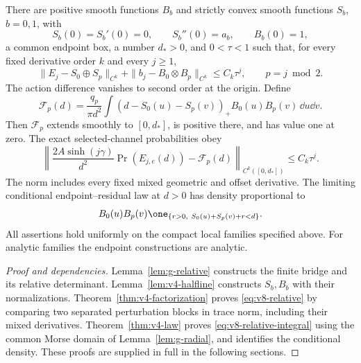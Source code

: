 \begin{theorem}\label{thm:v8-main-relative}
There are positive smooth functions $B_b$ and strictly convex smooth
functions $S_b$, $b=0,1$, with
\[
 S_b(0)=S_b'(0)=0,\qquad S_b''(0)=a_b,\qquad B_b(0)=1,
\]
a common endpoint box, a number $d_*>0$, and $0<\tau<1$ such that,
for every fixed derivative order $k$ and every $j\ge1$,
\begin{equation}\label{eq:v8-relative}
 \|E_j-S_0\oplus S_p\|_{C^k}
 +\|b_j-B_0\otimes B_p\|_{C^k}\le C_k\tau^j,
                    \qquad p=j\bmod2.
\end{equation}
The action difference vanishes to second order at the origin. Define
\begin{equation}\label{eq:v8-boundary-integral}
 \mathcal F_p(d)=\frac{q_p}{\pi d^2}
  \int(d-S_0(u)-S_p(v))_+B_0(u)B_p(v)\,\dd u\dd v.
\end{equation}
Then $\mathcal F_p$ extends smoothly to $[0,d_*]$, is positive there,
and has value one at zero. The exact selected-channel probabilities obey
\begin{equation}\label{eq:v8-relative-integral}
 \left\|\frac{2A\sinh(j\gamma)}{d^2}
           \Pr(E_{j,e}(d))-\mathcal F_p(d)\right\|_{C^k([0,d_*])}
                                  \le C_k\tau^j.
\end{equation}
The norm includes every fixed mixed geometric and offset derivative.
The limiting conditional endpoint--residual law at $d>0$ has density
proportional to
\[
 B_0(u)B_p(v)\one_{\{r>0,\ S_0(u)+S_p(v)+r<d\}}.
\]
All assertions hold uniformly on the compact local families specified
above. For analytic families the endpoint constructions are analytic.
\end{theorem}

\begin{proof}[Proof and dependencies]
Lemma~\ref{lem:g-relative} constructs the finite bridge and its relative
determinant. Lemma~\ref{lem:v4-halfline} constructs $S_b,B_b$ with their
normalizations. Theorem~\ref{thm:v4-factorization} proves
\eqref{eq:v8-relative} by comparing two separated perturbation blocks in
trace norm, including their mixed derivatives. Theorem~\ref{thm:v4-law}
proves \eqref{eq:v8-relative-integral} using the common Morse domain of
Lemma~\ref{lem:g-radial}, and identifies the conditional density.
These proofs are supplied in full in the following sections.
\end{proof}

